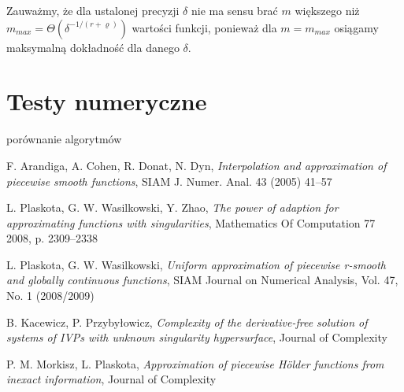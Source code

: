 \documentclass[oik, pdftex, robocza, man]{mgrwms}
\begin{document}
\begin{uw}
    Zauważmy, że dla ustalonej precyzji $\delta$ nie ma sensu brać $m$ większego niż $m_{max} = \varTheta(\delta^{-1 / (r+\varrho)})$ wartości funkcji, ponieważ dla $m = m_{max}$ osiągamy maksymalną dokładność dla danego $\delta$.
\end{uw}




\mgrclosechapter



\chapter{Testy numeryczne}

porównanie algorytmów

\mgrclosechapter





%  
\begin{thebibliography}{88}

    F. Arandiga, A. Cohen, R. Donat, N. Dyn,
    \emph{Interpolation and approximation of piecewise smooth functions}, SIAM J. Numer. Anal. 43 (2005) 41–57

    L. Plaskota, G. W. Wasilkowski, Y. Zhao, 
    \emph{The power of adaption for approximating functions with singularities}, Mathematics Of Computation 77
    2008, p. 2309–2338

    L. Plaskota, G. W. Wasilkowski, 
    \emph{Uniform approximation of piecewise r-smooth and globally continuous functions}, SIAM Journal on Numerical
    Analysis, Vol. 47, No. 1 (2008/2009)

    B. Kacewicz, P. Przybyłowicz, 
    \emph{Complexity of the derivative-free solution of
    systems of IVPs with unknown singularity hypersurface}, Journal of Complexity
    
    P. M. Morkisz, L. Plaskota, 
    \emph{Approximation of piecewise Hölder functions from inexact information}, Journal of Complexity

\end{thebibliography}
\end{document}
